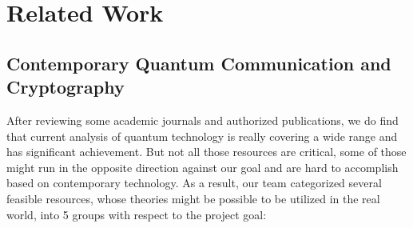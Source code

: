 \documentclass[sigconf]{acmart}
\begin{document}
\section{Related Work}
\subsection{Contemporary Quantum Communication and Cryptography} %
After reviewing some academic journals and authorized publications, we do find that current analysis of quantum technology is really covering a wide range and has significant achievement. But not all those resources are critical, some of those might run in the opposite direction against our goal and are hard to accomplish based on contemporary technology. As a result, our team categorized several feasible resources, whose theories might be possible to be utilized in the real world, into 5 groups with respect to the project goal:
\end{document}
